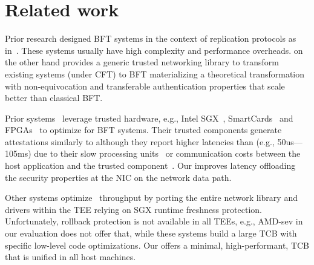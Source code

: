 \section{Related work}

 Prior research designed BFT systems in the context of replication protocols as in~\cite{Castro:2002, 10.1145/1658357.1658358, 199398, Suri_Payer_2021, DBLP:journals/corr/abs-1803-05069, Chan2018PaLaAS, DBLP:journals/corr/abs-1807-04938, Chan2018PiLiAE}. These systems usually have high complexity and performance overheads. \projecttitle{} on the other hand provides a generic trusted networking library to transform existing systems (under CFT) to BFT materializing a theoretical transformation with non-equivocation and transferable authentication properties that scale better than classical BFT.

 Prior systems~\cite{10.1145/3492321.3519568, minBFT, 10.1145/3552326.3587455, 10.1145/3492321.3519568} leverage trusted hardware, e.g., Intel SGX~\cite{intel-sgx}, SmartCards~\cite{levin2009trinc} and FPGAs~\cite{10.1145/2168836.2168866} to optimize for BFT systems. Their trusted components generate attestations similarly to \projecttitle{} although they report higher latencies than \projecttitle{} (e.g., 50us---105ms) due to their slow processing units~\cite{levin2009trinc} or communication costs between the host application and the trusted component~\cite{10.1145/2168836.2168866}. Our \projecttitle{} improves latency offloading the security properties at the NIC on the network data path. 

Other systems optimize~\cite{treaty, avocado, ccf} throughput by porting the entire network library and drivers within the TEE relying on SGX runtime freshness protection. Unfortunately, rollback protection is not available in all TEEs, e.g., AMD-sev in our evaluation does not offer that, while these systems build a large TCB with specific low-level code optimizations. Our \projecttitle{} offers a minimal, high-performant, TCB that is unified in all host machines. %


